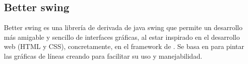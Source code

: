 \subsection{Better swing}

Better swing es una librería de derivada de java swing que permite un desarrollo más amigable y sencillo de interfaces gráficas, al estar inspirado en el desarrollo web (HTML y CSS), concretamente, en el framework de . Se basa en  para pintar las gráficas de líneas creando  para facilitar su uso y manejabilidad.




